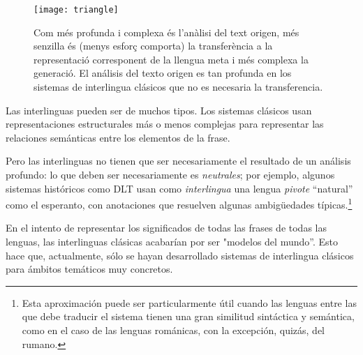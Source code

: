 \begin{figure} \begin{center} \texttt{[image: triangle]} \end{center} \caption{Com més profunda i complexa és l'anàlisi del text origen, més senzilla és (menys esforç comporta) la transferència a la representació corresponent de la llengua meta i més complexa la generació. El análisis del texto origen es tan profunda en los sistemas de interlingua clásicos que no es necesaria la transferencia.} \label{fg:triangle} \end{figure} 

Las interlinguas pueden ser de muchos tipos. Los sistemas clásicos usan representaciones estructurales más o menos complejas para representar las relaciones semánticas entre los elementos de la frase. 

Pero las interlinguas no tienen que ser necesariamente el resultado de un análisis profundo: lo que deben ser necesariamente es \emph{neutrales}; por ejemplo, algunos sistemas históricos como DLT \citep[cap.~17]{hutchins92b} usan como \emph{interlingua} una lengua \emph{pivote} ``natural'' como el esperanto, con anotaciones que resuelven algunas ambigüedades típicas.\footnote{Esta aproximación puede ser particularmente útil cuando las lenguas entre las que debe traducir el sistema tienen una gran similitud sintáctica y semántica, como en el caso de las lenguas románicas, con la excepción, quizás, del rumano.} 

En el intento de representar los significados de todas las frases de todas las lenguas, las interlinguas clásicas acabarían por ser "modelos del mundo''. Esto hace que, actualmente, sólo se hayan desarrollado sistemas de interlingua clásicos para ámbitos temáticos muy concretos. 

